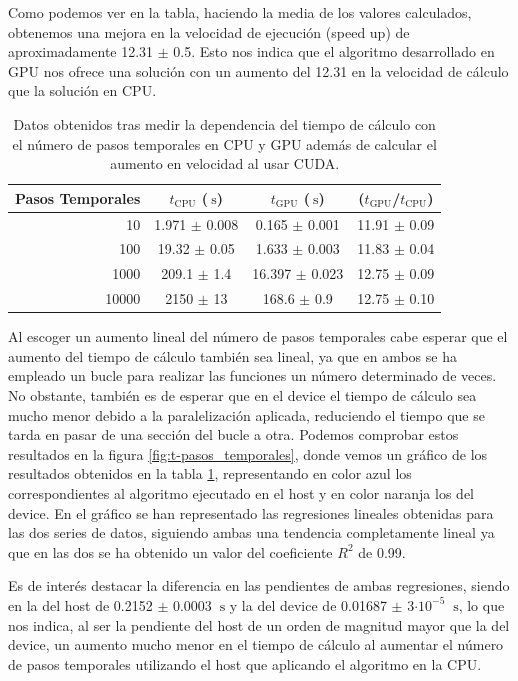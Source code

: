 \documentclass[11pt,a4paper,twoside,pdf]{article}
\numberwithin{equation}{section}
\begin{document}
Como podemos ver en la tabla, haciendo la media de los valores calculados, obtenemos una mejora en la velocidad de ejecución (speed up) de aproximadamente 12.31 $\pm$ 0.5. Esto nos indica que el algoritmo desarrollado en GPU nos ofrece una solución con un aumento del 12.31 en la velocidad de cálculo que la solución en CPU.

\begin{table}[h]
    \centering
    \begin{tabular}{|r|c|c|c|}
    \hline
    Pasos Temporales &  $t_\text{CPU}$ ($\SI{}{\second}$)  & $t_\text{GPU}$ ($\SI{}{\second}$) &  ($t_\text{GPU}$/$t_\text{CPU}$)  \\ \hline \hline
     10 & 1.971 $\pm$ 0.008 & 0.165 $\pm$ 0.001 & 11.91 $\pm$ 0.09\\ \hline
     100 & 19.32 $\pm$ 0.05 & 1.633 $\pm$ 0.003 & 11.83 $\pm$ 0.04\\ \hline
     1000 & 209.1 $\pm$ 1.4 & 16.397 $\pm$ 0.023 & 12.75 $\pm$ 0.09\\ \hline
     10000 & 2150 $\pm$ 13 & 168.6 $\pm$ 0.9 & 12.75 $\pm$ 0.10\\ \hline
    \end{tabular}
    \caption{Datos obtenidos tras medir la dependencia del tiempo de cálculo con el número de pasos temporales en CPU y GPU además de calcular el aumento en velocidad al usar CUDA.}
    \label{tab:npasos}
\end{table}


Al escoger un aumento lineal del número de pasos temporales cabe esperar que el aumento del tiempo de cálculo también sea lineal, ya que en ambos se ha empleado un bucle para realizar las funciones un número determinado de veces. No obstante, también es de esperar que en el device el tiempo de cálculo sea mucho menor debido a la paralelización aplicada, reduciendo el tiempo que se tarda en pasar de una sección del bucle a otra. Podemos comprobar estos resultados en la figura \ref{fig:t-pasos_temporales}, donde vemos un gráfico de los resultados obtenidos en la tabla \ref{tab:npasos}, representando en color azul los correspondientes al algoritmo ejecutado en el host y en color naranja los del device. En el gráfico se han representado las regresiones lineales obtenidas para las dos series de datos, siguiendo ambas una tendencia completamente lineal ya que en las dos se ha obtenido un valor del coeficiente $R^2$ de 0.99.

Es de interés destacar la diferencia en las pendientes de ambas regresiones, siendo en la del host de 0.2152 $\pm$ 0.0003 $\SI{}{\second}$ y la del device de 0.01687 $\pm$ 3$\cdot 10^{-5}$ $\SI{}{\second}$, lo que nos indica, al ser la pendiente del host de un orden de magnitud mayor que la del device, un aumento mucho menor en el tiempo de cálculo al aumentar el número de pasos temporales utilizando el host que aplicando el algoritmo en la CPU.
\end{document}
